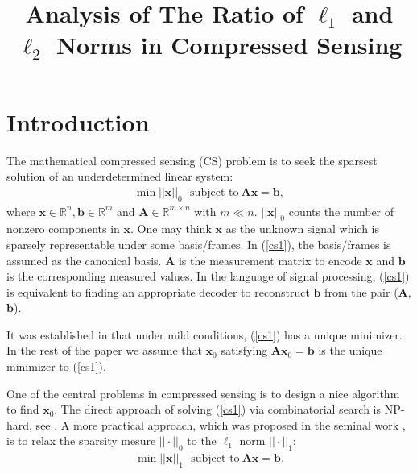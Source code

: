\documentclass[11pt]{article}
\numberwithin{equation}{section}
\theoremstyle{plain}
\theoremstyle{definition}
\def\R{{\mathbb R}}
\def\R{{\mathbb R}}
\def\A{{\mathbf A}}
\def\x{{\mathbf x}}
\def\b{{\mathbf b}}
\begin{document}
\title{Analysis of The Ratio of $\ell_1$ and $\ell_2$ Norms in Compressed Sensing}

\maketitle



\section{Introduction}
The mathematical compressed sensing (CS) problem is to seek the sparsest solution of an underdetermined linear system:
\begin{align}
\min ||\x||_0 \ \ \ \text{subject to}\ \A\x=\b,\label{cs1}
\end{align}
where $\x\in\R^n, \b\in\R^m$ and $\A\in\R^{m\times n}$ with $m\ll n$. $|| \x||_0$ counts the number of nonzero components in $\x$. One may think $\x$ as the unknown signal which is sparsely representable under some basis/frames. In (\ref{cs1}), the basis/frames is assumed as the canonical basis. $\A$ is the measurement matrix to encode $\x$ and $\b$ is the corresponding measured values. In the language of signal processing, (\ref{cs1}) is equivalent to finding an appropriate decoder to reconstruct $\b$ from the pair ($\A$, $\b$).  

It was established in \cite{donoho2003optimally} that under mild conditions, (\ref{cs1}) has a unique minimizer. In the rest of the paper we assume that $\x_0$ satisfying $\A\x_0=\b$ is the unique minimizer to (\ref{cs1}).  

One of the central problems in compressed sensing is to design a nice algorithm to find $\x_0$. The direct approach of solving (\ref{cs1}) via combinatorial search is NP-hard, see \cite{natarajan1995sparse}. A more practical approach, which was proposed in the seminal work \cite{donoho2006compressed}, is to relax the sparsity mesure $|| \cdot||_0$ to the $\ell_1$ norm $|| \cdot||_1$:
\begin{align}
\min ||\x||_1 \ \ \ \text{subject to}\ \A\x=\b.\label{l11}
\end{align} 
\end{document}
